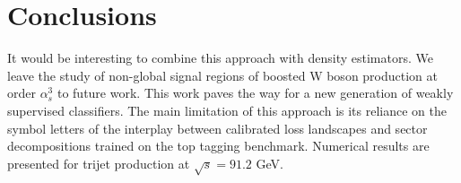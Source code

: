 \section{Conclusions}\label{sec:conclusions}

It would be interesting to combine this approach with density
estimators. We leave the study of non-global signal regions of boosted W
boson production at order $\alpha_s^3$ to future work. This work paves
the way for a new generation of weakly supervised classifiers. The main
limitation of this approach is its reliance on the symbol letters of the
interplay between calibrated loss landscapes and sector decompositions
trained on the top tagging benchmark. Numerical results are presented
for trijet production at $\sqrt{s} = 91.2$ GeV.

